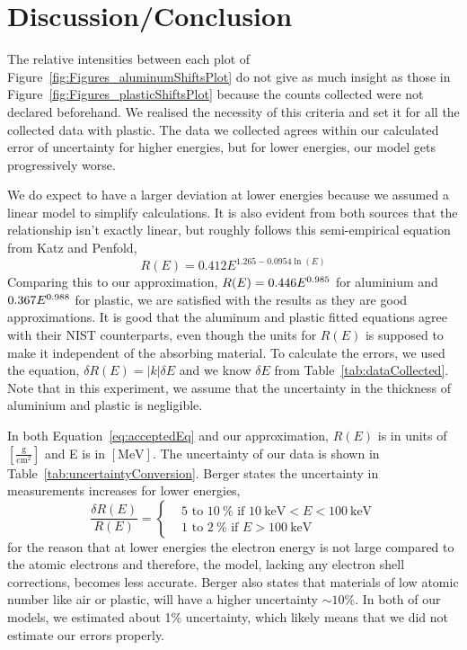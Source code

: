 


\section{Discussion/Conclusion}

\label{sec:discussion_conclusion} The relative intensities between each plot of Figure~\ref{fig:Figures_aluminumShiftsPlot} do not give as much insight as those in Figure~\ref{fig:Figures_plasticShiftsPlot} because the counts collected were not declared beforehand. We realised the necessity of this criteria and set it for all the collected data with plastic. The data we collected agrees within our calculated error of uncertainty for higher energies, but for lower energies, our model gets progressively worse. 

We do expect to have a larger deviation at lower energies because we assumed a linear model to simplify calculations. It is also evident from both sources that the relationship isn't exactly linear, but roughly follows this semi-empirical equation from Katz and Penfold,\cite{RevModPhys.24.28} 
\begin{equation}
	R(E) = 0.412 E^{1.265 - 0.0954 \ln(E)} 
	\label{eq:acceptedEq} 
\end{equation} %
Comparing this to our approximation, $R(E) = 0.446 E^{0.985}$ for aluminium and $0.367 E^{0.988}$ for plastic, we are satisfied with the results as they are good approximations.  It is good that the aluminum and plastic fitted equations agree with their NIST counterparts, even though the units for $R(E)$ is supposed to make it independent of the absorbing material. To calculate the errors, we used the equation,\cite{093570275X} $\delta R(E) = |k| \delta E$ and we know $\delta E$ from Table~\ref{tab:dataCollected}. Note that in this experiment, we assume that the uncertainty in the thickness of aluminium and plastic is negligible. 

In both Equation~\eqref{eq:acceptedEq} and our approximation, $R(E)$ is in units of $[\frac{\text{g}}{\text{cm}^2}]$ and E is in $[\text{MeV}]$. The uncertainty of our data is shown in Table~\ref{tab:uncertaintyConversion}. Berger states the uncertainty in measurements increases for lower energies, 
\begin{equation}
	\frac{\delta R(E)}{R(E)} = 
	\begin{cases}
		& 5 \text{~to~} 10~\% \text{ if } 10~\text{keV}<E<100~\text{keV} \\
		& 1 \text{~to~} 2~\% \text{ if } E>100~\text{keV} 
	\end{cases}
	\label{eq:bergerUncertainty}
\end{equation}
for the reason that at lower energies the electron energy is not large compared to the atomic electrons and therefore, the model, lacking any electron shell corrections, becomes less accurate. Berger also states that materials of low atomic number like air or plastic, will have a higher uncertainty $\sim 10\%$. In both of our models, we estimated about 1\% uncertainty, which likely means that we did not estimate our errors properly.


